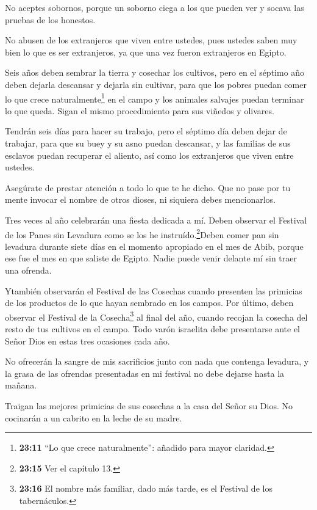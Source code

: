  No aceptes sobornos, porque un soborno ciega a los que
pueden ver y socava las pruebas de los honestos.

 No abusen de los extranjeros que viven entre ustedes, pues
ustedes saben muy bien lo que es ser extranjeros, ya que una vez fueron
extranjeros en Egipto.

 Seis años deben sembrar la tierra y cosechar los cultivos,
 pero en el séptimo año deben dejarla descansar y dejarla
sin cultivar, para que los pobres puedan comer lo que crece
naturalmente\footnote{\textbf{23:11} ``Lo que crece naturalmente'':
  añadido para mayor claridad.} en el campo y los animales salvajes
puedan terminar lo que queda. Sigan el mismo procedimiento para sus
viñedos y olivares.

 Tendrán seis días para hacer su trabajo, pero el séptimo
día deben dejar de trabajar, para que su buey y su asno puedan
descansar, y las familias de sus esclavos puedan recuperar el aliento,
así como los extranjeros que viven entre ustedes.

 Asegúrate de prestar atención a todo lo que te he dicho.
Que no pase por tu mente invocar el nombre de otros dioses, ni siquiera
debes mencionarlos.

 Tres veces al año celebrarán una fiesta dedicada a mí.
 Deben observar el Festival de los Panes sin Levadura como
se los he instruído.\footnote{\textbf{23:15} Ver el capítulo 13.}Deben
comer pan sin levadura durante siete días en el momento apropiado en el
mes de Abib, porque ese fue el mes en que saliste de Egipto. Nadie puede
venir delante mí sin traer una ofrenda.

 Ytambién observarán el Festival de las Cosechas cuando
presenten las primicias de los productos de lo que hayan sembrado en los
campos. Por último, deben observar el Festival de la Cosecha\footnote{\textbf{23:16}
  El nombre más familiar, dado más tarde, es el Festival de los
  tabernáculos.} al final del año, cuando recojan la cosecha del resto
de tus cultivos en el campo.  Todo varón israelita debe
presentarse ante el Señor Dios en estas tres ocasiones cada año.

 No ofrecerán la sangre de mis sacrificios junto con nada
que contenga levadura, y la grasa de las ofrendas presentadas en mi
festival no debe dejarse hasta la mañana.

 Traigan las mejores primicias de sus cosechas a la casa
del Señor su Dios. No cocinarán a un cabrito en la leche de su madre.

